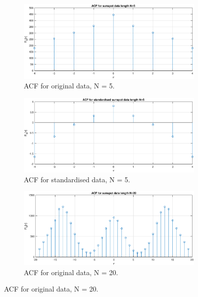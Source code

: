 \begin{figure}[H]
    \begin{center}
\begin{subfigure}{0.5\textwidth}
  \includegraphics[width=\linewidth]{assignment2figs/acf_sun5.eps}
  \caption{ACF for original data, N = 5.}
  \label{fig:rp1mean}
\end{subfigure}\hfil 
\begin{subfigure}{0.5\textwidth}
  \includegraphics[width=\linewidth]{assignment2figs/acf_sun_norm_5.eps}
  \caption{ACF for standardised data, N = 5.}
  \label{fig:rp1SD}
\end{subfigure}
\medskip
\begin{subfigure}{0.5\textwidth}
  \includegraphics[width=\linewidth]{assignment2figs/acf_sun20.eps}
  \caption{ACF for original data, N = 20.}
  \label{fig:rp2mean}
\end{subfigure}\hfil 

\end{center}
\end{figure}
